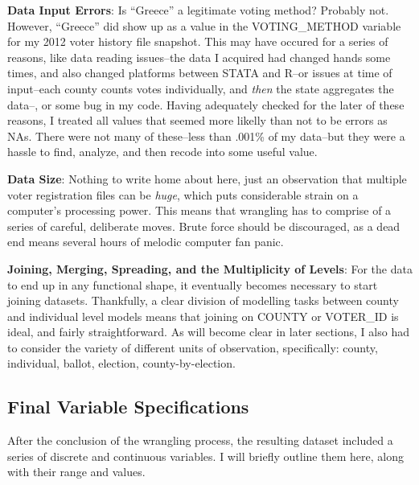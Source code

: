 \documentclass[12pt,twoside]{reedthesis}
\begin{document}
  \textbf{Data Input Errors}: Is ``Greece'' a legitimate voting method?
  Probably not. However, ``Greece'' did show up as a value in the
  VOTING\_METHOD variable for my 2012 voter history file snapshot. This
  may have occured for a series of reasons, like data reading issues--the
  data I acquired had changed hands some times, and also changed platforms
  between STATA and R--or issues at time of input--each county counts
  votes individually, and \emph{then} the state aggregates the data--, or
  some bug in my code. Having adequately checked for the later of these
  reasons, I treated all values that seemed more likelly than not to be
  errors as NAs. There were not many of these--less than .001\% of my
  data--but they were a hassle to find, analyze, and then recode into some
  useful value.
  
  \textbf{Data Size}: Nothing to write home about here, just an
  observation that multiple voter registration files can be \emph{huge},
  which puts considerable strain on a computer's processing power. This
  means that wrangling has to comprise of a series of careful, deliberate
  moves. Brute force should be discouraged, as a dead end means several
  hours of melodic computer fan panic.
  
  \textbf{Joining, Merging, Spreading, and the Multiplicity of Levels}:
  For the data to end up in any functional shape, it eventually becomes
  necessary to start joining datasets. Thankfully, a clear division of
  modelling tasks between county and individual level models means that
  joining on COUNTY or VOTER\_ID is ideal, and fairly straightforward. As
  will become clear in later sections, I also had to consider the variety
  of different units of observation, specifically: county, individual,
  ballot, election, county-by-election.
  
  \subsection{Final Variable
  Specifications}\label{final-variable-specifications}
  
  After the conclusion of the wrangling process, the resulting dataset
  included a series of discrete and continuous variables. I will briefly
  outline them here, along with their range and values.
  
\end{document}
